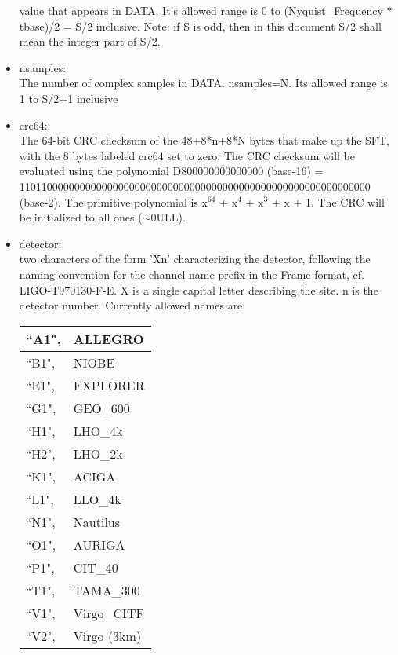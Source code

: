 \documentclass{ligodcc}
\begin{document}
\begin{itemize}
          value that appears
          in DATA.  It's allowed range is 0 to (Nyquist\_Frequency *
          tbase)/2 = S/2 inclusive.  Note: if S is odd, then in this
          document S/2 shall mean the integer part of S/2.
\item nsamples:\\
 The number of complex samples in DATA.  nsamples=N.  Its
          allowed range is 1 to S/2+1 inclusive
\item crc64:\\
The 64-bit CRC checksum of the 48+8*n+8*N bytes that make up
       the SFT, with the 8 bytes labeled crc64 set to zero.  The
       CRC checksum will be evaluated using the
       polynomial D800000000000000 (base-16) =\\
       1101100000000000000000000000000000000000000000000000000000000000 (base-2).
       The primitive polynomial is x$^{64}$ + x$^4$ + x$^3$ + x + 1.
       The CRC will be initialized to all ones ($\sim$0ULL).
\item detector:\\
two characters of the form 'Xn' characterizing the detector,
       following the naming convention for the channel-name prefix
       in the Frame-format, cf. LIGO-T970130-F-E.
	X is a single capital letter describing the site.
	n is the detector number.
       Currently allowed names are:

\begin{table}[ht]
\centering
\begin{tabular}{|l|l|}
\hline
	  ``A1",       & ALLEGRO \\
\hline
  	  ``B1",       & NIOBE \\
\hline
    	  ``E1",       & EXPLORER \\
\hline
          ``G1",       & GEO\_600 \\
\hline
          ``H1",       & LHO\_4k \\
\hline
          ``H2",       & LHO\_2k \\
\hline
          ``K1",       & ACIGA \\
\hline
          ``L1",       & LLO\_4k \\
\hline
          ``N1",       & Nautilus \\
\hline
          ``O1",       & AURIGA \\
\hline
          ``P1",       & CIT\_40 \\
\hline
          ``T1",       & TAMA\_300 \\
\hline
          ``V1",       & Virgo\_CITF \\
\hline
          ``V2",       & Virgo (3km) \\
\hline
\end{tabular}
\end{table}


\end{itemize}
\end{document}
